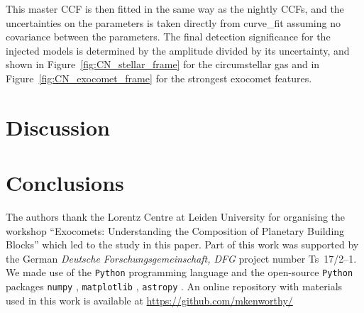 \documentclass{aa}
\begin{document}
This master CCF is then fitted in the same way as the nightly CCFs, and the uncertainties on the parameters is taken directly from curve\_fit assuming no covariance between the parameters. The final detection significance for the injected models is determined by the amplitude divided by its uncertainty, and shown in Figure~\ref{fig:CN_stellar_frame} for the circumstellar gas and in Figure~\ref{fig:CN_exocomet_frame} for the strongest exocomet features.




\section{Discussion}




\section{Conclusions}


\begin{acknowledgements}

The authors thank the Lorentz Centre at Leiden University for organising the workshop ``Exocomets: Understanding the Composition of Planetary Building Blocks'' which led to the study in this paper. 
%
Part of this work was supported by the German \emph{Deut\-sche For\-schungs\-ge\-mein\-schaft, DFG\/} project number Ts~17/2--1.
%
We made use of the {\tt Python} programming language \citep{rossum1995} and the open-source {\tt Python} packages {\tt numpy} \citep{walt2011}, {\tt matplotlib} \citep{hunter2007}, {\tt astropy} \citep{astropy2013}.
%      
An online repository with materials used in this work is available at \url{https://github.com/mkenworthy/}
\end{acknowledgements}









\end{document}
